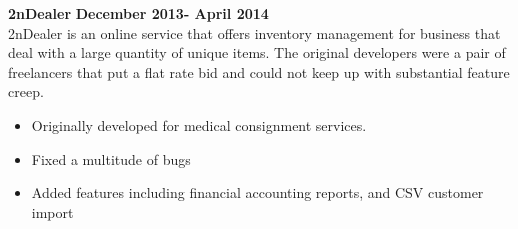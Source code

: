 \documentclass[overlapped]{res}
\begin{document}
\begin{resume}
\begin{itemize}[leftmargin=0in]
\begin{itemize}[leftmargin=0in]
                \begin{samepage}
                    \textbf{2nDealer} \hfill \textbf{December 2013- April 2014} \\
                    2nDealer is an online service that offers inventory management for business that deal with a large quantity of unique items.  
                    The original developers were a pair of freelancers that put a flat rate bid and could not keep up with substantial feature creep.
                    \begin{itemize}
                        \item[\textbullet] Originally developed for medical consignment services.
                        \item[\textbullet] Fixed a multitude of bugs
                        \item[\textbullet] Added features including financial accounting reports, and CSV customer import
                    \end{itemize}
                \end{samepage}
        \end{itemize}
        \vspace{0.125in}


\end{itemize}
\end{resume}
\end{document}
